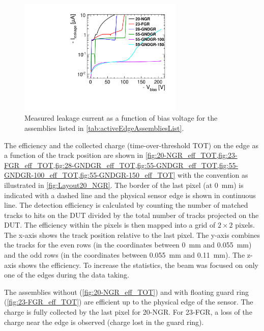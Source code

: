 \begin{figure}[htbp]
  \centering
  \includegraphics[width=0.7\textwidth]{figures/ActiveEdge/IVCurve.pdf}
  \caption{Measured leakage current as a function of bias voltage for
    the assemblies listed in \cref{tab:activeEdgeAssembliesList}.}
  \label{fig:IVmeasurements}
\end{figure}

The efficiency and the collected charge (time-over-threshold TOT) on
the edge as a function of the track position are shown in
\cref{fig:20-NGR_eff_TOT,fig:23-FGR_eff_TOT,fig:28-GNDGR_eff_TOT,fig:55-GNDGR_eff_TOT,fig:55-GNDGR-100_eff_TOT,fig:55-GNDGR-150_eff_TOT}
with the convention as illustrated in \cref{fig:Layout20_NGR}. The
border of the last pixel (at 0~mm) is indicated with a dashed line and
the physical sensor edge is shown in continuous line. The detection
efficiency is calculated by counting the number of matched tracks to
hits on the DUT divided by the total number of tracks projected on the
DUT. The efficiency within the pixels is then mapped into a grid of
$2\times2$ pixels. The x-axis shows the track position relative to the
last pixel. The y-axis combines the tracks for the even rows (in the
coordinates between 0~mm and 0.055~mm) and the odd rows (in the
coordinates between 0.055~mm and 0.11~mm). The z-axis shows the
efficiency. To increase the statistics, the beam was focused on only
one of the edges during the data taking.


The assemblies without (\cref{fig:20-NGR_eff_TOT}) and with floating
guard ring (\cref{fig:23-FGR_eff_TOT}) are efficient up to the physical
edge of the sensor. The charge is fully collected by the last pixel
for 20-NGR. For 23-FGR, a loss of the charge near the edge is observed
(charge lost in the guard ring).

